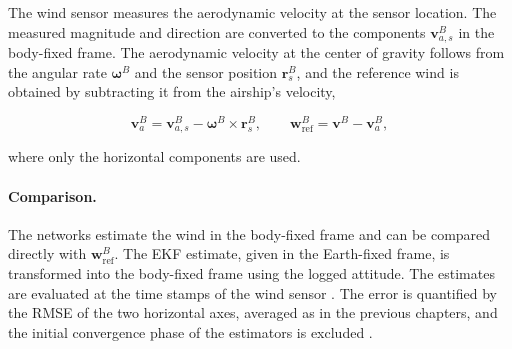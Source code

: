 The wind sensor measures the aerodynamic velocity at the sensor location. The measured magnitude and direction are converted to the components $\bm{v}_{a,s}^{B}$ in the body-fixed frame. The aerodynamic velocity at the center of gravity follows from the angular rate $\bm{\omega}^{B}$ and the sensor position $\bm{r}_s^{B}$, and the reference wind is obtained by subtracting it from the airship's velocity,

\begin{equation}
	\bm{v}_{a}^{B} = \bm{v}_{a,s}^{B} - \bm{\omega}^{B} \times \bm{r}_s^{B}, \qquad
	\bm{w}_{\mathrm{ref}}^{B} = \bm{v}^{B} - \bm{v}_{a}^{B},
	\label{eq:reference_wind}
\end{equation}

where only the horizontal components are used. 

\paragraph{Comparison.}
The networks estimate the wind in the body-fixed frame and can be compared directly with $\bm{w}_{\mathrm{ref}}^{B}$. The EKF estimate, given in the Earth-fixed frame, is transformed into the body-fixed frame using the logged attitude. The estimates are evaluated at the time stamps of the wind sensor . The error is quantified by the RMSE of the two horizontal axes, averaged as in the previous chapters, and the initial convergence phase of the estimators is excluded .